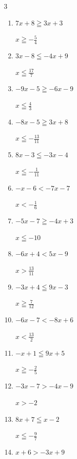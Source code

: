 \begin{multicols}{3}
\begin{enumerate}
        $\displaystyle x\geqq 1$

  \item $7x+8\geqq 3x+3$

        $\displaystyle x\geqq -\frac{5}{4}$

  \item $3x-8\leqq -4x+9$

        $\displaystyle x\leqq \frac{17}{7}$

  \item $-9x-5\geqq -6x-9$

        $\displaystyle x\leqq \frac{4}{3}$

  \item $-8x-5\geqq 3x+8$

        $\displaystyle x\leqq -\frac{13}{11}$

  \item $8x-3\leqq -3x-4$

        $\displaystyle x\leqq -\frac{1}{11}$

  \item $-x-6<-7x-7$

        $\displaystyle x<-\frac{1}{6}$

  \item $-5x-7\geqq -4x+3$

        $\displaystyle x\leqq -10$

  \item $-6x+4<5x-9$

        $\displaystyle x>\frac{13}{11}$

  \item $-3x+4\leqq 9x-3$

        $\displaystyle x\geqq \frac{7}{12}$

  \item $-6x-7<-8x+6$

        $\displaystyle x<\frac{13}{2}$

\columnbreak %

  \item $-x+1\leqq 9x+5$

        $\displaystyle x\geqq -\frac{2}{5}$

  \item $-3x-7>-4x-9$

        $\displaystyle x>-2$

  \item $8x+7\leqq x-2$

        $\displaystyle x\leqq -\frac{9}{7}$

  \item $x+6>-3x+9$


\end{enumerate}
\end{multicols}
